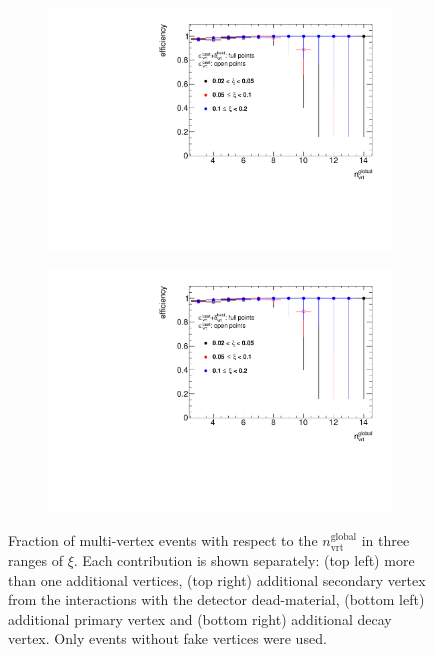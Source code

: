\begin{figure}[h!]
\begin{subfigure}{.47\textwidth}
		\includegraphics[width=\textwidth,page=6]{chapters/chrgSTAR/img/vertex/vertexEffi_ksi_noFake.pdf}
	\end{subfigure}
	\begin{subfigure}{.47\textwidth}
		\includegraphics[width=\textwidth,page=7]{chapters/chrgSTAR/img/vertex/vertexEffi_ksi_noFake.pdf}
	\end{subfigure}
	\caption{Fraction of multi-vertex events  with respect to the $n_\textrm{vrt}^\textrm{global}$ in three ranges of $\xi$. Each contribution is shown separately: (top left) more than one additional vertices, (top right) additional secondary vertex from the interactions with the detector dead-material, (bottom left) additional primary vertex and (bottom right)  additional decay vertex. Only events without fake vertices were used.}
		\label{fig:vertexVeto_noFake}
\end{figure}

\FloatBarrier
